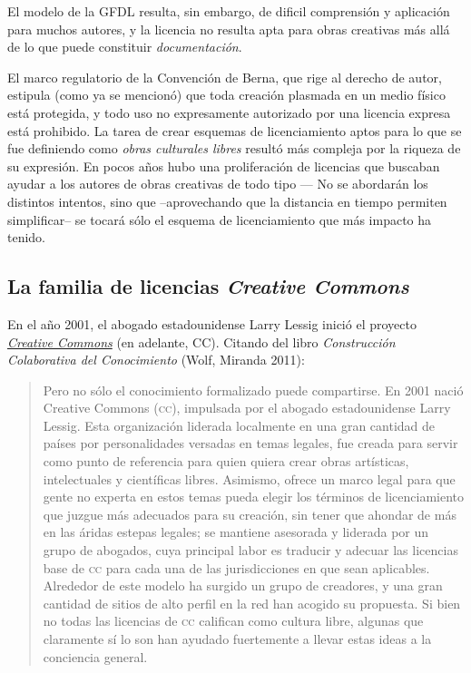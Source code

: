 \documentclass[11pt,fleqn]{book} %
\begin{document}
El modelo de la GFDL resulta, sin embargo, de dificil comprensión y
aplicación para muchos autores, y la licencia no resulta apta para
obras creativas más allá de lo que puede constituir
\emph{documentación}.

El marco regulatorio de la Convención de Berna, que rige al derecho de
autor, estipula (como ya se mencionó) que toda creación plasmada en un
medio físico está protegida, y todo uso no expresamente autorizado por
una licencia expresa está prohibido. La tarea de crear esquemas de
licenciamiento aptos para lo que se fue definiendo como \emph{obras culturales libres} resultó más compleja por la riqueza de su
expresión. En pocos años hubo una proliferación de licencias que
buscaban ayudar a los autores de obras creativas de todo tipo — No se
abordarán los distintos intentos, sino que –aprovechando que la
distancia en tiempo permiten simplificar– se tocará sólo el esquema de
licenciamiento que más impacto ha tenido.
\subsection{La familia de licencias \emph{Creative Commons}}
\label{sec-8-2-1}
\label{SL_CC}


En el año 2001, el abogado estadounidense Larry Lessig inició el
proyecto \emph{\href{http://www.creativecommons.org/}{Creative Commons}} (en adelante, \textsc{CC}). Citando del
libro \emph{Construcción Colaborativa del Conocimiento} (Wolf, Miranda
2011):

\begin{quote}
Pero no sólo el conocimiento formalizado puede compartirse. En 2001
nació Creative Commons (\textsc{cc}), impulsada por el abogado
estadounidense Larry Lessig. Esta organización liderada localmente en
una gran cantidad de países por personalidades versadas en temas
legales, fue creada para servir como punto de referencia para quien
quiera crear obras artísticas, intelectuales y científicas
libres. Asimismo, ofrece un marco legal para que gente no experta en
estos temas pueda elegir los términos de licenciamiento que juzgue más
adecuados para su creación, sin tener que ahondar de más en las áridas
estepas legales; se mantiene asesorada y liderada por un grupo de
abogados, cuya principal labor es traducir y adecuar las licencias
base de \textsc{cc} para cada una de las jurisdicciones en que sean
aplicables. Alrededor de este modelo ha surgido un grupo de creadores,
y una gran cantidad de sitios de alto perfil en la red han acogido su
propuesta. Si bien no todas las licencias de \textsc{cc} califican
como cultura libre, algunas que claramente sí lo son han ayudado
fuertemente a llevar estas ideas a la conciencia general.
\end{quote}
\end{document}
